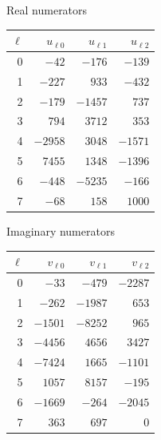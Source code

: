 \documentclass[UTF8,11pt]{ctexart}
\theoremstyle{definition}
\numberwithin{equation}{section}
\begin{document}
\begin{center}
\begin{minipage}{\textwidth}\centering
\small
Real numerators
\smallskip

\begin{tabular}{rrrr}
\toprule
$\ell$ & $u_{\ell0}$ & $u_{\ell1}$ & $u_{\ell2}$ \\
\midrule
0 & $-42$ & $-176$ & $-139$ \\
1 & $-227$ & $933$ & $-432$ \\
2 & $-179$ & $-1457$ & $737$ \\
3 & $794$ & $3712$ & $353$ \\
4 & $-2958$ & $3048$ & $-1571$ \\
5 & $7455$ & $1348$ & $-1396$ \\
6 & $-448$ & $-5235$ & $-166$ \\
7 & $-68$ & $158$ & $1000$ \\
\bottomrule
\end{tabular}
\end{minipage}
\end{center}

\begin{center}
\begin{minipage}{\textwidth}\centering
\small
Imaginary numerators
\smallskip

\begin{tabular}{rrrr}
\toprule
$\ell$ & $v_{\ell0}$ & $v_{\ell1}$ & $v_{\ell2}$ \\
\midrule
0 & $-33$ & $-479$ & $-2287$ \\
1 & $-262$ & $-1987$ & $653$ \\
2 & $-1501$ & $-8252$ & $965$ \\
3 & $-4456$ & $4656$ & $3427$ \\
4 & $-7424$ & $1665$ & $-1101$ \\
5 & $1057$ & $8157$ & $-195$ \\
6 & $-1669$ & $-264$ & $-2045$ \\
7 & $363$ & $697$ & $0$ \\
\bottomrule
\end{tabular}
\end{minipage}
\end{center}
\end{document}
